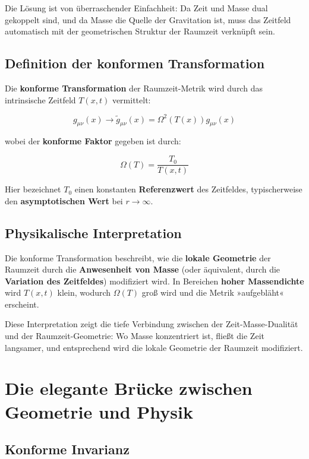 \documentclass[12pt,a4paper]{report}
\begin{document}
	Die Lösung ist von überraschender Einfachheit: Da Zeit und Masse dual gekoppelt sind, und da Masse die Quelle der Gravitation ist, muss das Zeitfeld automatisch mit der geometrischen Struktur der Raumzeit verknüpft sein.
	
	\subsection{Definition der konformen Transformation}
	
	Die \textbf{konforme Transformation} der Raumzeit-Metrik wird durch das intrinsische Zeitfeld $T(x,t)$ vermittelt:
	
	\begin{equation}
		g_{\mu\nu}(x) \to \tilde{g}_{\mu\nu}(x) = \Omega^2(T(x)) g_{\mu\nu}(x)
	\end{equation}
	
	wobei der \textbf{konforme Faktor} gegeben ist durch:
	
	\begin{equation}
		\Omega(T) = \frac{T_0}{T(x,t)}
	\end{equation}
	
	Hier bezeichnet $T_0$ einen konstanten \textbf{Referenzwert} des Zeitfeldes, typischerweise den \textbf{asymptotischen Wert} bei $r \to \infty$.
	
	\subsection{Physikalische Interpretation}
	
	Die konforme Transformation beschreibt, wie die \textbf{lokale Geometrie} der Raumzeit durch die \textbf{Anwesenheit von Masse} (oder äquivalent, durch die \textbf{Variation des Zeitfeldes}) modifiziert wird. In Bereichen \textbf{hoher Massendichte} wird $T(x,t)$ klein, wodurch $\Omega(T)$ groß wird und die Metrik »aufgebläht« erscheint.
	
	Diese Interpretation zeigt die tiefe Verbindung zwischen der Zeit-Masse-Dualität und der Raumzeit-Geometrie: Wo Masse konzentriert ist, fließt die Zeit langsamer, und entsprechend wird die lokale Geometrie der Raumzeit modifiziert.
	
	\section{Die elegante Brücke zwischen Geometrie und Physik}
	
	\subsection{Konforme Invarianz}
	
\end{document}
